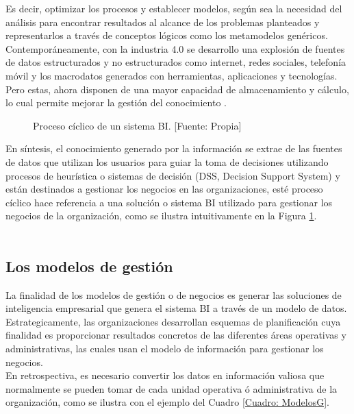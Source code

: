 \documentclass[11pt,titlepage]{report}
\begin{document}
 Es decir, optimizar los procesos y establecer modelos, según sea la necesidad del análisis para encontrar resultados al alcance de los problemas planteados y representarlos a través de conceptos lógicos como los metamodelos genéricos.\\ 

Contemporáneamente, con la industria 4.0 se desarrollo una explosión de fuentes de datos estructurados y no estructurados como internet, redes sociales, telefonía móvil y los macrodatos generados con herramientas,  aplicaciones y tecnologías. Pero estas, ahora disponen de una mayor capacidad de almacenamiento y cálculo, lo cual permite mejorar la gestión del conocimiento \cite{art04}.\\

\begin{figure}
	\caption{Proceso cíclico de un sistema BI. [Fuente: Propia]} \label{fig: DSS}
\end{figure}

En síntesis, el conocimiento generado por la información se extrae de las fuentes de datos que utilizan los usuarios para guiar la toma de decisiones utilizando procesos de heurística o sistemas de decisión (DSS, Decision Support System) y están destinados a gestionar los negocios en las organizaciones, esté proceso cíclico hace referencia a una solución o sistema BI utilizado para gestionar los negocios de la organización, como se ilustra intuitivamente en la Figura \ref{fig: DSS}.\\ \\


\subsection{Los modelos de gestión}

La finalidad de los modelos de gestión o de negocios es generar las soluciones de inteligencia empresarial que genera el sistema BI a través de un modelo de datos. Estrategicamente, las organizaciones desarrollan esquemas de planificación cuya finalidad es proporcionar resultados concretos de las diferentes áreas operativas y administrativas, las cuales usan el modelo de información para gestionar los negocios.\\

En retrospectiva, es necesario convertir los datos en información valiosa que normalmente se pueden tomar de cada unidad operativa ó administrativa de la organización, como se ilustra con el ejemplo del Cuadro \ref{Cuadro: ModelosG}. 
\end{document}
